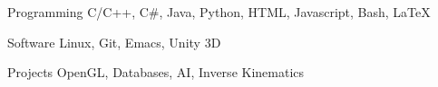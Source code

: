 

\begin{cvskills}

  \cvskill
    {Programming} %
    {C/C++, C\#, Java, Python, HTML, Javascript, Bash, LaTeX}

  \cvskill
    {Software} %
    {Linux, Git, Emacs, Unity 3D} %

  \cvskill
    {Projects} %
    {OpenGL, Databases, AI, Inverse Kinematics} %


\end{cvskills}
